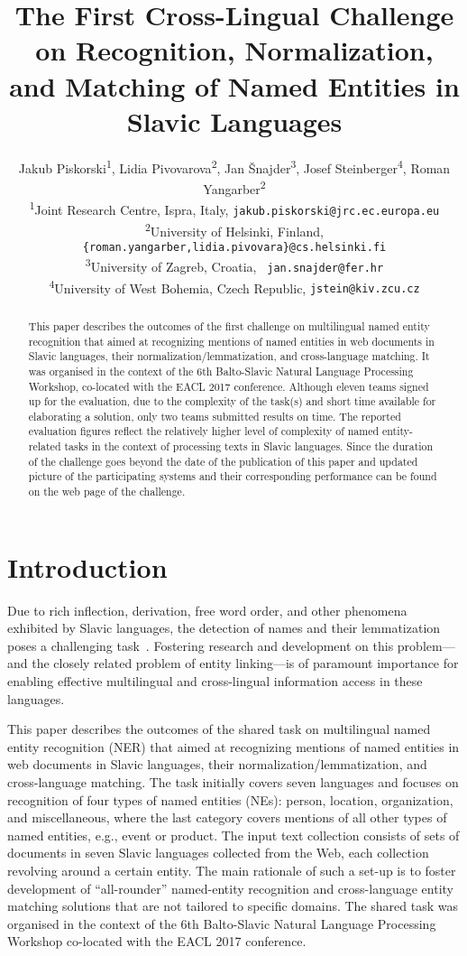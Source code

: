 \documentclass[11pt]{article}
\title{The First Cross-Lingual Challenge on Recognition,
  Normalization,  
  \\ and Matching of Named Entities in Slavic Languages}
\author{Jakub Piskorski\textsuperscript{1},
  Lidia Pivovarova\textsuperscript{2},
  Jan Šnajder\textsuperscript{3},
  Josef Steinberger\textsuperscript{4},
  Roman Yangarber\textsuperscript{2} \\
  \textsuperscript{1}Joint Research Centre,
  \comment{Via Enrico Fermi 2749, 21027}Ispra\comment{ (VA)}, Italy,
  {\small \tt jakub.piskorski@jrc.ec.europa.eu} \\
  \textsuperscript{2}University of Helsinki, Finland, {\small \tt
  \{roman.yangarber,lidia.pivovara\}@cs.helsinki.fi}\\
    \textsuperscript{3}University of Zagreb, Croatia, {\small \tt
    jan.snajder@fer.hr} \\
  \textsuperscript{4}University of West Bohemia, Czech Republic, 
  {\small \tt jstein@kiv.zcu.cz} 
  }
\date{}
\begin{document}
\maketitle
\begin{abstract}

This paper describes the outcomes of the first challenge on multilingual named entity recognition 
that aimed at recognizing mentions of named entities in web documents in Slavic languages, 
their normalization/lemmatization, and cross-language matching. It was organised in 
the context of the 6th Balto-Slavic Natural Language Processing Workshop, co-located with the 
EACL 2017 conference. Although eleven teams signed up for the evaluation, due to the complexity
of the task(s) and short time available for elaborating a solution, only two teams submitted results
on time. The reported evaluation figures reflect the relatively higher level of complexity of 
named entity-related tasks in the context of processing texts in Slavic languages. Since the 
duration of the challenge goes beyond the date of the publication of this paper and updated
picture of the participating systems and their corresponding performance can be found on
the web page of the challenge.

\end{abstract}

\section{Introduction}
\label{sec:intro}

Due to rich inflection, derivation, free word order, and other phenomena
exhibited by Slavic languages, the detection of names and their
lemmatization poses a challenging
task~\cite{Przepiorkowski:2007:SIE:1567545.1567547,journals/ir/PiskorskiWS09}.
Fostering research and development on this problem---and the closely
related problem of entity linking---is of paramount importance for
enabling effective multilingual and cross-lingual information access in
these languages.

This paper describes the outcomes of the shared task on multilingual
named entity recognition {(NER)} that aimed at recognizing mentions
of named entities in web documents in Slavic languages, their
normalization/lemmatization, and cross-language matching.  The task
initially covers seven languages and focuses on recognition of four types
of named entities (NEs): person, location, organization, and
miscellaneous, where the last category covers mentions of all other types
of named entities, e.g., event or product.  The input text collection
consists of sets of documents in {seven Slavic languages} collected from
the Web, each collection revolving around a certain entity. The main
rationale of such a set-up is to foster development of ``all-rounder''
named-entity recognition and cross-language entity matching solutions
that are not tailored to specific domains.  The shared task was organised
in the context of the 6th Balto-Slavic Natural Language Processing
Workshop co-located with the EACL 2017 conference.
\end{document}
